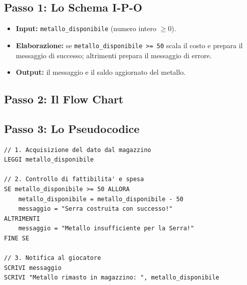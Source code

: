 \subsection{Passo 1: Lo Schema I-P-O}

\begin{itemize}
  \item \textbf{Input:} \texttt{metallo\_disponibile} (numero intero $\geq 0$).
  \item \textbf{Elaborazione:} se \texttt{metallo\_disponibile >= 50} scala il costo e prepara il messaggio di successo; altrimenti prepara il messaggio di errore.
  \item \textbf{Output:} il messaggio e il saldo aggiornato del metallo.
\end{itemize}

\subsection{Passo 2: Il Flow Chart}

\begin{center}
\end{center}

\subsection{Passo 3: Lo Pseudocodice}

\begin{lstlisting}
// 1. Acquisizione del dato dal magazzino
LEGGI metallo_disponibile

// 2. Controllo di fattibilita' e spesa
SE metallo_disponibile >= 50 ALLORA
    metallo_disponibile = metallo_disponibile - 50
    messaggio = "Serra costruita con successo!"
ALTRIMENTI
    messaggio = "Metallo insufficiente per la Serra!"
FINE SE

// 3. Notifica al giocatore
SCRIVI messaggio
SCRIVI "Metallo rimasto in magazzino: ", metallo_disponibile
\end{lstlisting}

